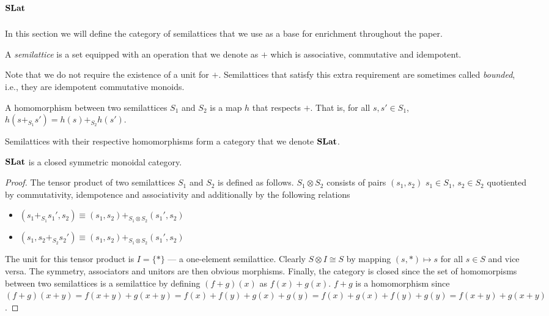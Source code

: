 \section{$\mathbf{SLat}$}
\label{sec:appendix:slat}

In this section we will define the category of semilattices that we use as a base for enrichment throughout the paper.

\begin{definition}[Semilattice]
	A \textit{semilattice} is a set equipped with an operation that we denote as $+$ which is associative, commutative and idempotent.
\end{definition}

Note that we do not require the existence of a unit for $+$.
Semilattices that satisfy this extra requirement are sometimes called \textit{bounded}, i.e., they are idempotent commutative monoids.

\begin{definition}

	A homomorphism between two semilattices $S_{1}$ and $S_{2}$ is a map $h$ that respects $+$.
	That is, for all $s,s' \in S_{1}$, $h(s +_{S_{1}} s') = h(s) +_{S_{2}} h(s')$.
\end{definition}

\begin{definition}

	Semilattices with their respective homomorphisms form a category that we denote $\mathbf{SLat}$.
\end{definition}

\begin{proposition}
	$\mathbf{SLat}$ is a closed symmetric monoidal category.
\end{proposition}
\begin{proof}
	The tensor product of two semilattices $S_{1}$ and $S_{2}$ is defined as follows.
	$S_{1} \otimes S_{2}$ consists of pairs $(s_1,s_2)$ $s_{1} \in S_{1}$, $s_{2} \in S_{2}$ quotiented by commutativity, idempotence and associativity and additionally by the following relations
	\begin{itemize}
		\item $(s_{1} +_{S_{1}} s_{1}',s_{2}) \equiv (s_{1},s_{2}) +_{S_{1} \otimes S_{2}} (s_{1}',s_{2})$
		\item $(s_{1}, s_{2} +_{S_{2}} s_{2}') \equiv (s_{1},s_{2}) +_{S_{1} \otimes S_{2}} (s_{1}',s_{2})$
	\end{itemize}

	The unit for this tensor product is $I = \{*\}$ --- a one-element semilattice.
	Clearly $S \otimes I \cong S$ by mapping $(s,*) \mapsto s$ for all $s \in S$ and vice versa.
	The symmetry, associators and unitors are then obvious morphisms.
	Finally, the category is closed since the set of homomorpisms between two semilattices is a semilattice by defining $(f + g)(x)$ as $f(x) + g(x)$.
	$f + g$ is a homomorphism since $(f + g)(x+y) = f(x+y) + g(x+y) = f(x) + f(y) + g(x) + g(y) = f(x) + g(x) + f(y) + g(y) = f(x+y) + g(x+y)$.
\end{proof}

